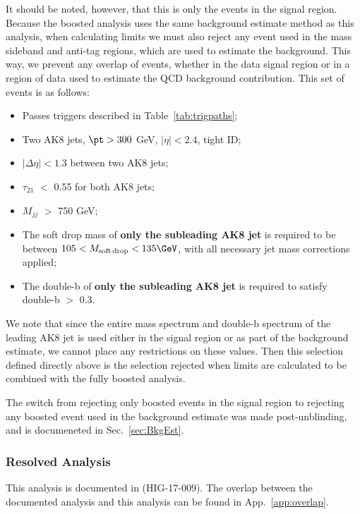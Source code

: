 It should be noted, however, that this is only the events in the signal region. Because the boosted analysis uses the same background estimate method as this analysis, when calculating limits we must also reject any event used in the mass sideband and anti-tag regions, which are used to estimate the background. This way, we prevent any overlap of events, whether in the data signal region or in a region of data used to estimate the QCD background contribution. This set of events is as follows:
\begin{itemize}
\item Passes triggers described in Table~\ref{tab:trigpaths};
\item Two AK8 jets, $\pt > 300$ GeV, $|\eta| < 2.4$, tight ID;
\item $|\Delta\eta| < 1.3$ between two AK8 jets;
\item $\tau_{21}$ $<$ 0.55 for both AK8 jets;
\item $M_{jj}$ $>$ 750 GeV;
\item The soft drop mass of \textbf{only the subleading AK8 jet} is required to be between $105 < M_{\rm soft\,drop} < 135\GeV$, with all necessary jet mass corrections applied;
\item The double-b of \textbf{only the subleading AK8 jet} is required to satisfy double-b $>$ 0.3.
\end{itemize}
We note that since the entire mass spectrum and double-b spectrum of the leading AK8 jet is used either in the signal region or as part of the background estimate, we cannot place any restrictions on these values. Then this selection defined directly above is the selection rejected when limits are calculated to be combined with the fully boosted 
analysis. 

The switch from rejecting only boosted events in the signal region to rejecting any boosted event used in the background estimate was made post-unblinding, and is documeneted in Sec.~\ref{sec:BkgEst}.

\subsubsection{Resolved Analysis\label{sss:resolve}}
This analysis is documented in (HIG-17-009). The overlap between the documented analysis and this analysis can be found in App.~\ref{app:overlap}.

